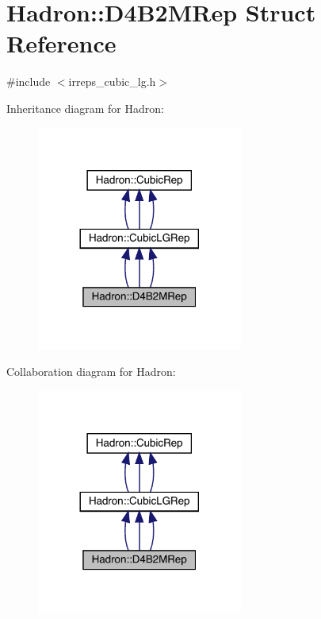\hypertarget{structHadron_1_1D4B2MRep}{}\section{Hadron\+:\+:D4\+B2\+M\+Rep Struct Reference}
\label{structHadron_1_1D4B2MRep}


{\ttfamily \#include $<$irreps\+\_\+cubic\+\_\+lg.\+h$>$}



Inheritance diagram for Hadron\+:
\nopagebreak
\begin{figure}[H]
\begin{center}
\leavevmode
\includegraphics[width=192pt]{d4/d33/structHadron_1_1D4B2MRep__inherit__graph}
\end{center}
\end{figure}


Collaboration diagram for Hadron\+:
\nopagebreak
\begin{figure}[H]
\begin{center}
\leavevmode
\includegraphics[width=192pt]{dc/d76/structHadron_1_1D4B2MRep__coll__graph}
\end{center}
\end{figure}
